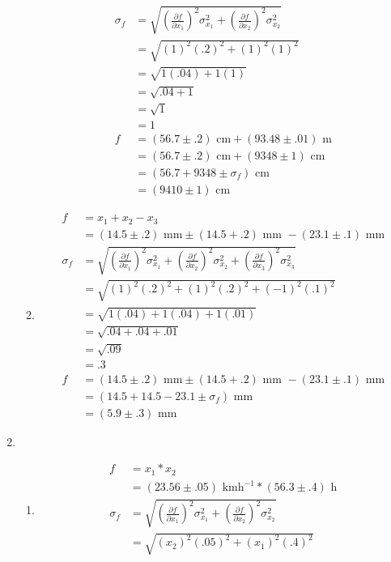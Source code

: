 \documentclass{article}
\begin{document}
\begin{enumerate}
\begin{enumerate}
\begin{align*}
\sigma_{f} &= \sqrt{(\frac{\partial f}{\partial x_1})^2\sigma_{x_1}^2 + (\frac{\partial f}{\partial x_2})^2\sigma_{x_2}^2}\\
&= \sqrt{(1)^2(.2)^2 + (1)^2(1)^2}\\
&= \sqrt{1(.04) + 1(1)}\\
&= \sqrt{.04 + 1}\\
&= \sqrt1\\
&= 1\\
f &= (56.7 \pm .2)\text{ cm} + (93.48 \pm .01)\text{ m}\\
&= (56.7 \pm .2)\text{ cm} + (9348 \pm 1)\text{ cm}\\
&= (56.7 + 9348 \pm \sigma_{f})\text{ cm}\\
&= (9410 \pm 1)\text{ cm}
\end{align*}
\item
\begin{align*}
f &= x_1 + x_2 - x_3\\
&= (14.5 \pm .2)\text{ mm} \pm (14.5 + .2)\text{ mm } - (23.1 \pm .1)\text{ mm}\\
\sigma_{f} &= \sqrt{(\frac{\partial f}{\partial x_1})^2\sigma_{x_1}^2 + (\frac{\partial f}{\partial x_2})^2\sigma_{x_2}^2 + (\frac{\partial f}{\partial x_3})^2\sigma_{x_3}^2}\\
&= \sqrt{(1)^2(.2)^2 + (1)^2(.2)^2 + (-1)^2(.1)^2}\\
&= \sqrt{1(.04) + 1(.04) + 1(.01)}\\
&= \sqrt{.04 + .04 + .01}\\
&= \sqrt{.09}\\
&= .3\\
f &= (14.5 \pm .2)\text{ mm} \pm (14.5 + .2)\text{ mm } - (23.1 \pm .1)\text{ mm}\\
&= (14.5 + 14.5 - 23.1 \pm \sigma_{f})\text{ mm}\\
&= (5.9 \pm .3)\text{ mm}
\end{align*}
\end{enumerate}
\item
\begin{enumerate}
\item
\begin{align*}
f &= x_1 * x_2\\
&= (23.56 \pm .05)\text{ kmh}^{-1} * (56.3 \pm .4)\text{ h}\\
\sigma_{f} &= \sqrt{(\frac{\partial f}{\partial x_1})^2\sigma_{x_1}^2 + (\frac{\partial f}{\partial x_2})^2\sigma_{x_2}^2}\\
&= \sqrt{(x_2)^2(.05)^2 + (x_1)^2(.4)^2}\\

\end{align*}
\end{enumerate}
\end{enumerate}
\end{document}
